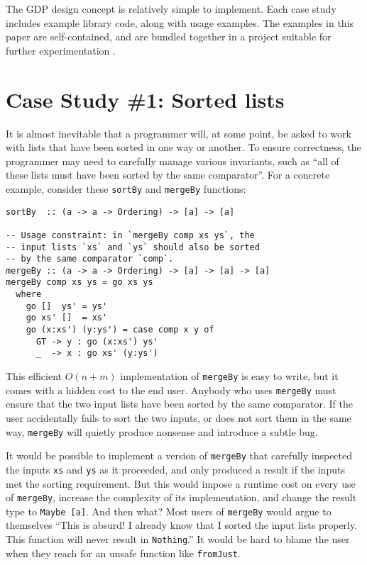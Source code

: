 \documentclass[format=sigplan, review=false, screen=true]{acmart}
\begin{document}
The GDP design concept is relatively simple to implement. Each case study includes example library code,
along with usage examples. The examples in this paper are self-contained, and are bundled together in
a project suitable for further experimentation \cite{this}.


\section{Case Study \#1: Sorted lists}

It is almost inevitable that a programmer will, at some point, be asked to work
with lists that have been sorted in one way or another. To ensure correctness,
the programmer may need to carefully manage various invariants, such
as ``all of these lists must have been sorted by the same comparator''. For a concrete
example, consider these \texttt{sortBy} and \texttt{mergeBy} functions:
\begin{verbatim}
sortBy  :: (a -> a -> Ordering) -> [a] -> [a]

-- Usage constraint: in `mergeBy comp xs ys`, the
-- input lists `xs` and `ys` should also be sorted
-- by the same comparator `comp`.
mergeBy :: (a -> a -> Ordering) -> [a] -> [a] -> [a]
mergeBy comp xs ys = go xs ys
  where
    go []  ys' = ys'
    go xs' []  = xs'
    go (x:xs') (y:ys') = case comp x y of
      GT -> y : go (x:xs') ys'
      _  -> x : go xs' (y:ys')
\end{verbatim}
This efficient $O(n+m)$ implementation of \texttt{mergeBy} is easy to write,
but it comes with a hidden cost to the end user. Anybody who uses \texttt{mergeBy}
must ensure that the two input lists have been sorted by the same comparator.
If the user accidentally fails to sort the two inputs, or does not sort them in the same way,
\texttt{mergeBy} will quietly produce nonsense and introduce a subtle bug.

It would be possible to implement a version of \texttt{mergeBy} that
carefully inspected the inputs \texttt{xs} and \texttt{ys} as it
proceeded, and only produced a result if the inputs met the sorting
requirement. But this would impose a runtime cost on every use of
\texttt{mergeBy}, increase the complexity of its implementation,
and change the result type to \texttt{Maybe [a]}. And then what?
Most users of \texttt{mergeBy} would argue to themselves ``This is
absurd! I already know that I sorted the input lists properly. This
function will never result in \texttt{Nothing}.'' It would be hard
to blame the user when they reach for an  unsafe function like
\texttt{fromJust}.
\end{document}
